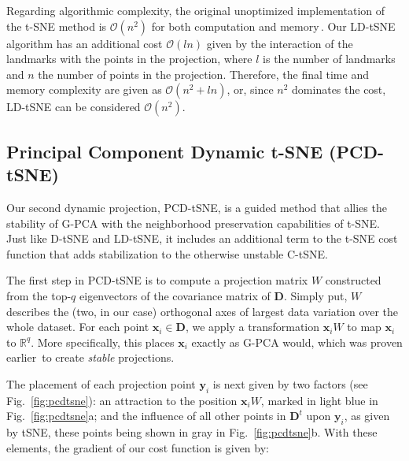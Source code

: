 Regarding algorithmic complexity, the original unoptimized implementation of the t-SNE method is $\mathcal{O}(n^2)$ for both computation and memory\,\cite{vanderMaaten2008}. Our LD-tSNE algorithm has an additional cost $\mathcal{O}(ln)$ given by the interaction of the landmarks with the points in the projection, where $l$ is the number of landmarks and $n$ the number of points in the projection. Therefore, the final time and memory complexity are given as $\mathcal{O}(n^2 + ln)$, or, since $n^2$ dominates the cost, LD-tSNE can be considered $\mathcal{O}(n^2)$. 

\subsection{Principal Component Dynamic t-SNE (PCD-tSNE)} 
\label{sec:pcd-tsne}
%
Our second dynamic projection, PCD-tSNE, is a guided method that allies the stability of G-PCA with the neighborhood preservation capabilities of t-SNE.
Just like D-tSNE and LD-tSNE, it includes an additional term to the t-SNE cost function that adds stabilization to the otherwise unstable C-tSNE. 

The first step in PCD-tSNE is to compute a projection matrix $W$ constructed from the top-$q$ eigenvectors of the covariance matrix of $\mathbf{D}$. Simply put, $W$ describes the (two, in our case) orthogonal axes of largest data variation over the whole dataset. For each point $\mathbf{x}_i \in \mathbf{D}$, we apply a transformation $\mathbf{x}_i W$ to map $\mathbf{x}_i$ to $\mathbb{R}^q$. More specifically, this places $\mathbf{x}_i$ exactly as G-PCA would, which was proven earlier\,\cite{Vernier2020} to create \emph{stable} projections.

The placement of each projection point $\mathbf{y}_i$ is next given by two factors (see Fig.~\ref{fig:pcdtsne}): an attraction to the position $\mathbf{x}_i W$, marked in light blue in Fig.~\ref{fig:pcdtsne}a; and the influence of all other points in $\mathbf{D}^t$ 
upon $\mathbf{y}_i$, as given by tSNE, these points being shown in gray in Fig.~\ref{fig:pcdtsne}b. With these elements, the gradient of our cost function is given by:  

%

